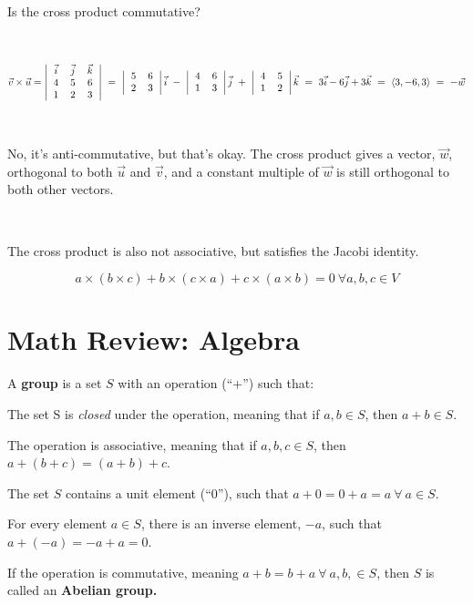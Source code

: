\documentclass[12pt]{article}
\begin{document}
\begin{spacing}{1.2}
\

Is the cross product commutative?

\

$\displaystyle\vec{v} \times \vec{u} = 
	\left|
	\begin{tabular}{*3{>{$}c<{$}}}
		\vec{i} & \vec{j} & \vec{k} \cr
		4 & 5 & 6 \cr
		1 & 2 & 3 \cr
	\end{tabular}
	\right|
\ = \
	\left|
	\begin{tabular}{cc}
		5 & 6 \cr
		2 & 3 \cr
	\end{tabular}
	\right|
	\vec{i}
\ - \	
	\left|
	\begin{tabular}{cc}
		4 & 6 \cr
		1 & 3 \cr
	\end{tabular}
	\right|
	\vec{j}
\ + \ 
	\left|
	\begin{tabular}{cc}
		4 & 5 \cr
		1 & 2 \cr
	\end{tabular}
	\right|
	\vec{k}
\ = \
	3\vec{i} - 6 \vec{j} + 3 \vec{k}
\ = \
	\langle 3,-6,3 \rangle
\ = \ -\vec{w}
$

\

No, it's anti-commutative, but that's okay.  The cross product gives a vector, $\vec{w}$, orthogonal to both $\vec{u}$ and $\vec{v}$, and a constant multiple of $\vec{w}$ is still orthogonal to both other vectors.  

\

The cross product is also not associative, but satisfies the Jacobi identity.

$$a \times (b \times c) + b \times (c \times a) + c \times (a \times b) = 0 \ \forall a, b, c \in V$$

\section{Math Review:  Algebra}

A {\bf group} is a set $S$ with an operation (``+'')  such that:

\qquad The set S is {\it closed} under the operation, meaning that if $a,b \in S$, then $a+b \in S$.

\qquad The operation is associative, meaning that if $a,b,c \in S$, then $a+(b+c) = (a+b)+c$.

\qquad The set $S$ contains a unit element (``0''), such that $a+0 = 0+a = a \ \forall \ a \in S.$

\qquad For every element $a \in S$, there is an inverse element, $-a$, such that $a+(-a) = -a + a = 0$.

If the operation is commutative, meaning $a+b = b+a \ \forall \ a, b, \in S$, then $S$ is called an {\bf Abelian group.}


\end{spacing}
\end{document}
